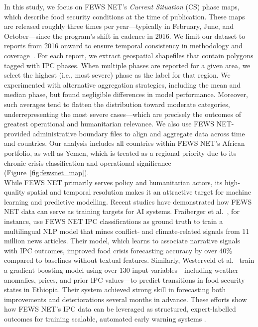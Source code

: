 \documentclass{article}
\begin{document}
In this study, we focus on FEWS NET’s \textit{Current Situation} (CS) phase maps, which describe food security conditions at the time of publication. These maps are released roughly three times per year—typically in February, June, and October—since the program’s shift in cadence in 2016. We limit our dataset to reports from 2016 onward to ensure temporal consistency in methodology and coverage~\citep{backer2021validating}. For each report, we extract geospatial shapefiles that contain polygons tagged with IPC phases. When multiple phases are reported for a given area, we select the highest (i.e., most severe) phase as the label for that region. We experimented with alternative aggregation strategies, including the mean and median phase, but found negligible differences in model performance. Moreover, such averages tend to flatten the distribution toward moderate categories, underrepresenting the most severe cases—which are precisely the outcomes of greatest operational and humanitarian relevance. We also use FEWS NET-provided administrative boundary files to align and aggregate data across time and countries. Our analysis includes all countries within FEWS NET’s African portfolio, as well as Yemen, which is treated as a regional priority due to its chronic crisis classification and operational significance (Figure~\ref{fig:fewsnet_map}).\\

While FEWS NET primarily serves policy and humanitarian actors, its high-quality spatial and temporal resolution makes it an attractive target for machine learning and predictive modelling. Recent studies have demonstrated how FEWS NET data can serve as training targets for AI systems. Fraiberger et al.~\citep{Fraiberger2023}, for instance, use FEWS NET IPC classifications as ground truth to train a multilingual NLP model that mines conflict- and climate-related signals from 11 million news articles. Their model, which learns to associate narrative signals with IPC outcomes, improved food crisis forecasting accuracy by over 40\% compared to baselines without textual features. Similarly, Westerveld et al.~\citep{westerveld2021forecasting} train a gradient boosting model using over 130 input variables—including weather anomalies, prices, and prior IPC values—to predict transitions in food security states in Ethiopia. Their system achieved strong skill in forecasting both improvements and deteriorations several months in advance. These efforts show how FEWS NET’s IPC data can be leveraged as structured, expert-labelled outcomes for training scalable, automated early warning systems \citep{michelson2023mlfs}.\\
\end{document}

